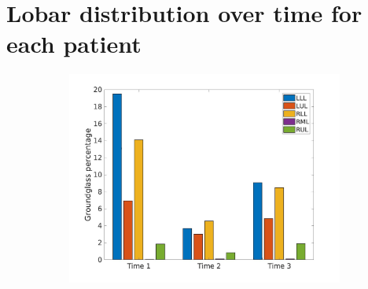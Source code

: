\section{Lobar distribution over time for each patient}

\begin{figure}[H] 
\centering
\begin{subfigure}{.46\linewidth}%
  \includegraphics[width=\linewidth,trim={{.0\wd0} {.0\wd0} {.0\wd0} {.0\wd0}},clip]{Appendix/Image_AppexA/LobarDistribution/IPF2GroundglassLobarRegionDiseaseDistributionOverTime.jpg} %

\end{subfigure}
\end{figure}
